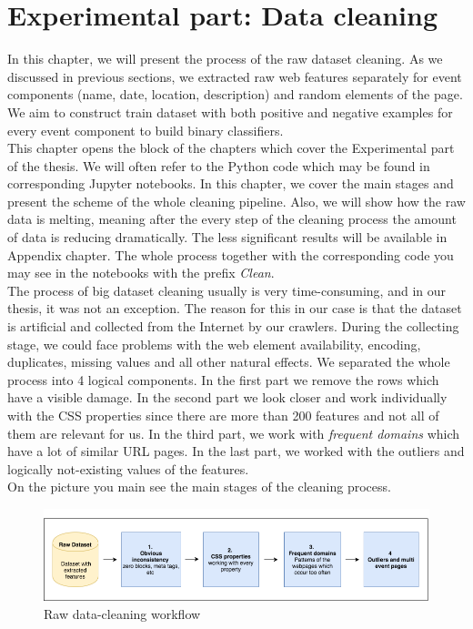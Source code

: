 \chapter{Experimental part: Data cleaning}
\label{chap:clean}
In this chapter, we will present the process of the raw dataset cleaning. As we discussed in previous sections, we extracted raw web features separately for event components (name, date, location, description) and random elements of the page. We aim to construct train dataset with both positive and negative examples for every event component to build binary classifiers. \\

This chapter opens the block of the chapters which cover the Experimental part of the thesis. We will often refer to the Python code which may be found in corresponding Jupyter notebooks. In this chapter, we cover the main stages and present the scheme of the whole cleaning pipeline. Also, we will show how the raw data is melting, meaning after the every step of the cleaning process the amount of data is reducing dramatically. The less significant results will be available in Appendix chapter. The whole process together with the corresponding code you may see in the notebooks with the prefix \textit{Clean}.\\

The process of big dataset cleaning usually is very time-consuming, and in our thesis, it was not an exception. The reason for this in our case is that the dataset is artificial and collected from the Internet by our crawlers. During the collecting stage, we could face problems with the web element availability, encoding, duplicates, missing values and all other natural effects. We separated the whole process into 4 logical components. In the first part we remove the rows which have a visible damage. In the second part we look closer and work individually with the CSS properties since there are more than 200 features and not all of them are relevant for us. In the third part, we work with \textit{frequent domains} which have a lot of similar URL pages. In the last part, we worked with the outliers and logically not-existing values of the features. \\

On the picture  you main see the main stages of the cleaning process.

\begin{figure}[h]
\begin{center}
\includegraphics[width=1.0\textwidth]{figures06/clean_workflow1}
\caption{Raw data-cleaning workflow}
\label{fig:clean}
\end{center}
\end{figure}

